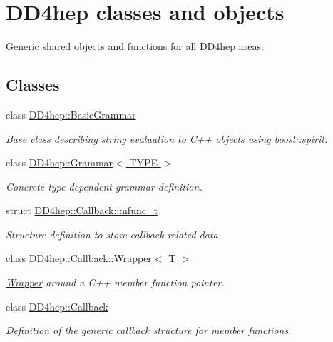 \hypertarget{group___d_d4_h_e_p}{}\section{D\+D4hep classes and objects}
\label{group___d_d4_h_e_p}


Generic shared objects and functions for all \hyperlink{namespace_d_d4hep}{D\+D4hep} areas.  


\subsection*{Classes}
\begin{DoxyCompactItemize}
\item 
class \hyperlink{class_d_d4hep_1_1_basic_grammar}{D\+D4hep\+::\+Basic\+Grammar}
\begin{DoxyCompactList}\small\item\em Base class describing string evaluation to C++ objects using boost\+::spirit. \end{DoxyCompactList}\item 
class \hyperlink{class_d_d4hep_1_1_grammar}{D\+D4hep\+::\+Grammar$<$ T\+Y\+P\+E $>$}
\begin{DoxyCompactList}\small\item\em Concrete type dependent grammar definition. \end{DoxyCompactList}\item 
struct \hyperlink{struct_d_d4hep_1_1_callback_1_1mfunc__t}{D\+D4hep\+::\+Callback\+::mfunc\+\_\+t}
\begin{DoxyCompactList}\small\item\em Structure definition to store callback related data. \end{DoxyCompactList}\item 
class \hyperlink{class_d_d4hep_1_1_callback_1_1_wrapper}{D\+D4hep\+::\+Callback\+::\+Wrapper$<$ T $>$}
\begin{DoxyCompactList}\small\item\em \hyperlink{class_d_d4hep_1_1_callback_1_1_wrapper}{Wrapper} around a C++ member function pointer. \end{DoxyCompactList}\item 
class \hyperlink{class_d_d4hep_1_1_callback}{D\+D4hep\+::\+Callback}
\begin{DoxyCompactList}\small\item\em Definition of the generic callback structure for member functions. \end{DoxyCompactList}\item 

\end{DoxyCompactItemize}
